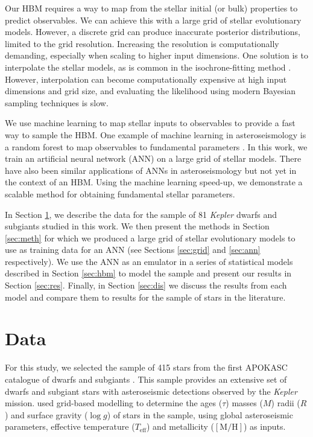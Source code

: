 \documentclass[a4paper,fleqn,usenatbib]{mnras}
\newcommand{\metallicity}{\ensuremath{[\mathrm{M}/\mathrm{H}]}}
\newcommand{\teff}{\ensuremath{T_\mathrm{eff}}}
\begin{document}
Our HBM requires a way to map from the stellar initial (or bulk) properties to predict observables. We can achieve this with a large grid of stellar evolutionary models. However, a discrete grid can produce inaccurate posterior distributions, limited to the grid resolution. Increasing the resolution is computationally demanding, especially when scaling to higher input dimensions. One solution is to interpolate the stellar models, as is common in the isochrone-fitting method \citep[see e.g.][]{Berger.Huber.ea2020}. However, interpolation can become computationally expensive at high input dimensions and grid size, and evaluating the likelihood using modern Bayesian sampling techniques is slow.

We use machine learning to map stellar inputs to observables to provide a fast way to sample the HBM. One example of machine learning in asteroseismology is a random forest to map observables to fundamental parameters \citep{Bellinger.Angelou.ea2016}. In this work, we train an artificial neural network (ANN) on a large grid of stellar models. There have also been similar applications of ANNs in asteroseismology \citep{Verma.Hanasoge.ea2016, Hendriks.Aerts2019} but not yet in the context of an HBM. Using the machine learning speed-up, we demonstrate a scalable method for obtaining fundamental stellar parameters.

In Section \ref{sec:data}, we describe the data for the sample of 81 \emph{Kepler} dwarfs and subgiants studied in this work. We then present the methods in Section \ref{sec:meth} for which we produced a large grid of stellar evolutionary models to use as training data for an ANN (see Sections \ref{sec:grid} and \ref{sec:ann} respectively). We use the ANN as an emulator in a series of statistical models described in Section \ref{sec:hbm} to model the sample and present our results in Section \ref{sec:res}. Finally, in Section \ref{sec:dis} we discuss the results from each model and compare them to results for the sample of stars in the literature.

\section{Data}\label{sec:data}

For this study, we selected the sample of 415 stars from the first APOKASC catalogue of dwarfs and subgiants \citep[][hereafter ]{Serenelli.Johnson.ea2017}. This sample provides an extensive set of dwarfs and subgiant stars with asteroseismic detections observed by the \emph{Kepler} mission.  used grid-based modelling to determine the ages ($\tau$) masses ($M$) radii ($R$) and surface gravity ($\log g$) of stars in the sample, using global asteroseismic parameters, effective temperature ($\teff$) and metallicity ($\metallicity$) as inputs. 
\end{document}
